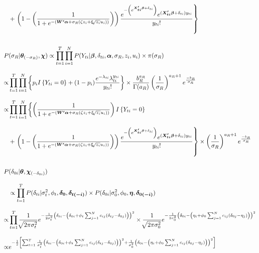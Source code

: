 \documentclass[12pt,a4paper]{article}
\begin{document}
\begin{CJK}{UTF8}{bkai}
\begin{align*}
& + \left. \left(1-\left( \frac{1}{1+e^{-(\bm{W^\prime}\bm{\alpha}+\sigma_R(\zeta z_i+\xi \sqrt[]{z_i} u_i))}} \right)\right)\frac{e^{-\left(e^{\bm{X_{ti}^\prime\bm{\beta}}+\delta_{ti}}\right)}e^{(\bm{X_{ti}^\prime\bm{\beta}}+\delta_{ti})y_{ti}}}{y_{ti}!}\right\}
\\ \hspace*{\fill} \\
 P & (\sigma_R|\bm{\theta}_{(-\sigma_R)},\bm{\chi}) \propto \prod_{t=1}^T \prod_{i=1}^N P(Y_{ti}|\bm{\beta},\delta_{ti},\bm{\alpha},\sigma_R,z_i,u_i) \times \pi(\sigma_R) \\[3mm]
 \propto &
\prod_{t=1}^T\prod_{i=1}^N \left\{ p_i I \left\{ Y_{ti} = 0 \right\}+(1-p_i)\frac{e^{-\lambda_{ti}}\lambda_{ti}^{y_{ti}}}{y_{ti}!}\right\} \times \frac{b_R^{a_R}}{\Gamma(a_R)}\left(\frac{1}{\sigma_R}\right)^{a_R+1} e^{\frac{-b_R}{\sigma_R}}\\[3mm]
 \propto &
\prod_{t=1}^T\prod_{i=1}^N \left\{ \left( \frac{1}{1+e^{-(\bm{W^\prime}\bm{\alpha}+\sigma_R(\zeta z_i+\xi \sqrt[]{z_i} u_i))}} \right)I\left\{ Y_{ti} = 0\right\} \right.\\[3mm]
& + \left. \left(1-\left( \frac{1}{1+e^{-(\bm{W^\prime}\bm{\alpha}+\sigma_R(\zeta z_i+\xi \sqrt[]{z_i} u_i))}} \right)\right)\frac{e^{-\left(e^{\bm{X_{ti}^\prime\bm{\beta}}+\delta_{ti}}\right)}e^{(\bm{X_{ti}^\prime\bm{\beta}}+\delta_{ti})y_{ti}}}{y_{ti}!}\right\} \times \left(\frac{1}{\sigma_R}\right)^{a_R+1} e^{\frac{-b_R}{\sigma_R}}
\\ \hspace*{\fill} \\
 P & (\delta_{0i}|\bm{\theta},\bm{\chi}_{(-\delta_{0i})}) \\[3mm]
& \propto \prod_{t=1}^T P(\delta_{ti}|\sigma_t^2,\phi_t,\bm{\delta_0},\bm{\delta_{t(-i)}}) \times P(\delta_{0i}|\sigma_0^2,\phi_0,\bm{\eta},\bm{\delta_{0(-i)}})\\[3mm]
 \propto &
\prod_{t=1}^T \frac{1}{\sqrt[]{2\pi \sigma_t^2}}e^{-\frac{1}{2\sigma_t^2}\left(\delta_{ti}-\left(\delta_{0i}+\phi_t\sum_{j=1}^N c_{ij}(\delta_{tj}-\delta_{0j})\right)\right)^2} \times \frac{1}{\sqrt[]{2 \pi \sigma_0^2}} e^{-\frac{1}{2\sigma_0^2}\left(\delta_{0i}-\left(\eta_i+\phi_0\sum_{j=1}^N c_{ij}(\delta_{0j}-\eta_j)\right)\right)^2} \\[3mm]
 \propto &
e^{-\frac{1}{2}\left[\sum_{t=1}^T\frac{1}{\sigma_t^2}\left(\delta_{ti}-\left(\delta_{0i}+\phi_t\sum_{j=1}^N c_{ij}(\delta_{tj}-\delta_{0j})\right)\right)^2 +\frac{1}{\sigma_0^2}\left(\delta_{0i}-\left(\eta_i+\phi_0\sum_{j=1}^N c_{ij}(\delta_{0j}-\eta_j)\right)\right)^2\right]} \\[3mm]

\end{align*}
\end{CJK}
\end{document}
